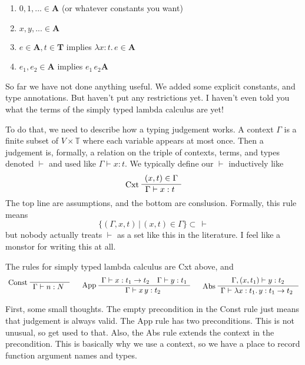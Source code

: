 \documentclass[12pt]{article}
\newenvironment{bprooftree}
  {\leavevmode\hbox\bgroup}
  {\DisplayProof\egroup}
\begin{document}
\begin{enumerate}
    \item $0,1,... \in \mathbf{A}$ (or whatever constants you want)
    \item $x,y,... \in \mathbf{A}$
    \item $e \in \mathbf{A}, t \in \mathbf{T}$ implies $\lambda x:t.\, e \in \mathbf{A}$
    \item $e_1, e_2 \in \mathbf{A}$ implies $e_1\, e_2 \mathbf{A}$
\end{enumerate}

So far we have not done anything useful. 
We added some explicit constants, and type annotations. 
But haven't put any restrictions yet.
I haven't even told you what the terms of the simply typed lambda calculus are yet!

To do that, we need to describe how a typing judgement works.
A context $\Gamma$ is a finite subset of $V \times \mathbb{T}$ where each variable appears at most once.
Then a judgement is, formally, a relation on the triple of contexts, terms, and types denoted $\vdash$ and used like $\Gamma \vdash x : t$.
We typically define our $\vdash$ inductively like
\[
\begin{bprooftree}
\AxiomC{$(x,t) \in \Gamma$}
\LeftLabel{Cxt}
\UnaryInfC{$\Gamma \vdash x : t$ }
\end{bprooftree}
\]
The top line are assumptions, and the bottom are conslusion.
Formally, this rule means 
\[
   \{(\Gamma, x, t) \,|\, (x,t) \in \Gamma\} \subset\, \vdash
\]
but nobody actually treats $\vdash$ as a set like this in the literature.
I feel like a monstor for writing this at all.

The rules for simply typed lambda calculus are Cxt above, and
\[
\begin{bprooftree}
\AxiomC{}
\LeftLabel{Const}
\UnaryInfC{$\Gamma \vdash n : N$ }
\end{bprooftree}\quad
\begin{bprooftree}
\AxiomC{$\Gamma \vdash x : t_1 \rightarrow t_2 \quad \Gamma \vdash y : t_1$}
\LeftLabel{App}
\UnaryInfC{$\Gamma \vdash x\, y : t_2$ }
\end{bprooftree}\quad
\begin{bprooftree}
\AxiomC{$\Gamma, (x,t_1) \vdash y : t_2$}
\LeftLabel{Abs}
\UnaryInfC{$\Gamma \vdash \lambda x:t_1.\, y : t_1 \rightarrow t_2$ }
\end{bprooftree}
\]

First, some small thoughts.
The empty precondition in the Const rule just means that judgement is always valid.
The App rule has two preconditions.
This is not unusual, so get used to that.
Also, the Abs rule extends the context in the precondition.
This is basically why we use a context, so we have a place to record function argument names and types.
\end{document}
